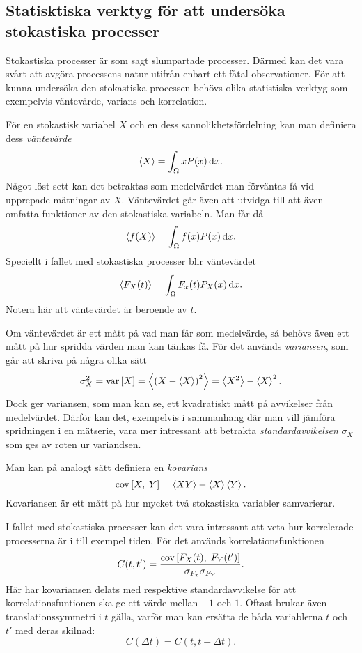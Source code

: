 \subsection{Statisktiska verktyg för att undersöka stokastiska processer}
Stokastiska processer är som sagt slumpartade processer. Därmed kan
det vara svårt att avgöra processens natur utifrån enbart ett fåtal
observationer. För att kunna undersöka den stokastiska processen
behövs olika statistiska verktyg som exempelvis väntevärde, varians
och korrelation. 

För en stokastisk variabel $X$ och en dess sannolikhetsfördelning kan
man definiera dess \emph{väntevärde}
\begin{equation}
    \ev{X} = \int_{\Omega} x P(x) \id{x}.
\end{equation}
Något löst sett kan det betraktas som medelvärdet man förväntas få vid
upprepade mätningar av $X$. 
Väntevärdet går även att utvidga till att även omfatta funktioner av
den stokastiska variabeln. Man får då 
\begin{equation}
    \ev{f(X)} = \int_{\Omega} f(x) P(x) \id{x}.
\end{equation}
Speciellt i fallet med stokastiska processer blir väntevärdet 
\begin{equation}
    \ev{F_X(t)} = \int_{\Omega} F_x(t)P_X(x) \id{x}.
\end{equation}
Notera här att väntevärdet är beroende av $t$.

Om väntevärdet är ett mått på vad man får som medelvärde, så behövs
även ett mått på hur spridda värden man kan tänkas få. För det används
\emph{variansen}, som går att skriva på några olika sätt
\begin{equation}
\sigma_X^2=\VAR{X} = \ev{\left(X-\ev{X} \right)^2} = \ev{X^2}-\ev{X}^2.
\end{equation}
Dock ger variansen, som man kan se, ett kvadratiskt mått på
avvikelser från medelvärdet. Därför kan det, exempelvis i sammanhang
där man vill jämföra spridningen i en mätserie, vara mer intressant
att betrakta \emph{standardavvikelsen} $\sigma_X$ som ges av roten ur
variandsen.

Man kan på analogt sätt definiera en \emph{kovarians}
\begin{equation}
\COV{X}{Y}  = \ev{XY}-\ev{X}\ev{Y}.
\end{equation}
Kovariansen är ett mått på hur mycket två stokastiska variabler
samvarierar. 

I fallet med stokastiska processer kan det vara intressant att veta
hur korrelerade processerna är i till exempel tiden. För det används
korrelationsfunktionen 
\begin{equation}
C(t, t') = \frac{\text{cov}\left[F_X(t),\;F_Y(t')\right]}{\sigma_{F_x}\sigma_{F_Y}}.
\end{equation}
Här har kovariansen delats med respektive standardavvikelse för att
korrelationsfuntionen ska ge ett värde mellan 
$-1$ och $1$. 
Oftast brukar även translationssymmetri i $t$ gälla, varför man kan
ersätta de båda variablerna $t$ och $t'$ med deras skilnad:
\begin{equation}
C(\Delta t) = C(t, t+\Delta t).
\end{equation}



